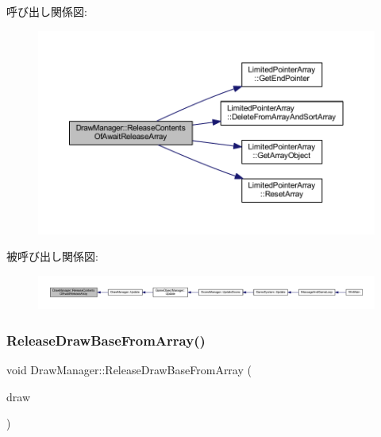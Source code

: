 呼び出し関係図\+:
\nopagebreak
\begin{figure}[H]
\begin{center}
\leavevmode
\includegraphics[width=350pt]{class_draw_manager_a76361402a035f02084e9faf31e782d69_cgraph}
\end{center}
\end{figure}
被呼び出し関係図\+:
\nopagebreak
\begin{figure}[H]
\begin{center}
\leavevmode
\includegraphics[width=350pt]{class_draw_manager_a76361402a035f02084e9faf31e782d69_icgraph}
\end{center}
\end{figure}
\mbox{\label{class_draw_manager_a287d1f359b87f075b22df6a9b6e99316}} 
\subsubsection{\texorpdfstring{Release\+Draw\+Base\+From\+Array()}{ReleaseDrawBaseFromArray()}}
{\footnotesize\ttfamily void Draw\+Manager\+::\+Release\+Draw\+Base\+From\+Array (\begin{DoxyParamCaption}\item[{\mbox{\hyperlink{class_draw_base}{Draw\+Base}} $\ast$}]{draw }\end{DoxyParamCaption})}




